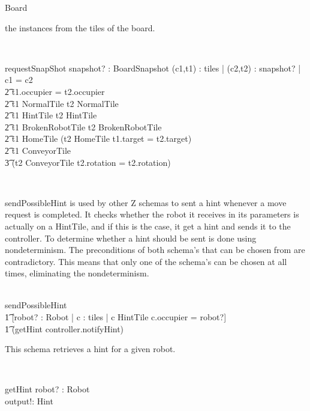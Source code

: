\documentclass[12pt]{article}
\begin{document}
\begin{class}{Board}
\begin{zpar}
the instances from the tiles of the board.
\end{zpar} \\
\begin{schema}{requestSnapShot}
snapshot? : BoardSnapshot
\where
\forall (c1,t1) : tiles | \exists (c2,t2) : snapshot? | c1 = c2 \: \wedge \\ \t2
t1.occupier = t2.occupier \: \wedge \\ \t2
t1 \in NormalTile \Rightarrow t2 \in NormalTile \: \wedge \\ \t2
t1 \in HintTile \Rightarrow t2 \in HintTile \: \wedge \\ \t2
t1 \in BrokenRobotTile \Rightarrow t2 \in BrokenRobotTile \: \wedge \\ \t2
t1 \in HomeTile \Rightarrow (t2 \in HomeTile \wedge t1.target = t2.target) \: \wedge \\ \t2
t1 \in ConveyorTile \Rightarrow \\ \t3 (t2 \in ConveyorTile \wedge t2.rotation = t2.rotation)
\end{schema} \\
\znewpage
\begin{zpar}
sendPossibleHint is used by other Z schemas to sent a hint whenever
a move request is completed. It checks whether the robot it receives in its
parameters is actually on a HintTile, and if this is the case, it get a hint
and sends it to the controller.
To determine whether a hint should be sent is done using nondeterminism.
The preconditions of both schema's that can be chosen from are contradictory.
This means that only one of the schema's can be chosen at all times,
eliminating the nondeterminism.
\end{zpar} \\
sendPossibleHint \sdef [robot? : Robot | \\ \t2 \neg \exists c : \ran tiles | c \in HintTile \wedge c.occupier = robot?] \; \; [] \\ \t1
[robot? : Robot | \exists c : \ran tiles | c \in HintTile \wedge c.occupier = robot?] \; \; \wedge \\ \t1 (getHint \comp controller.notifyHint) \\
\begin{zpar}
This schema retrieves a hint for a given robot.
\end{zpar} \\
\begin{schema}{getHint}
robot? : Robot \\
output!: Hint \\

\end{schema}
\end{class}
\end{document}
